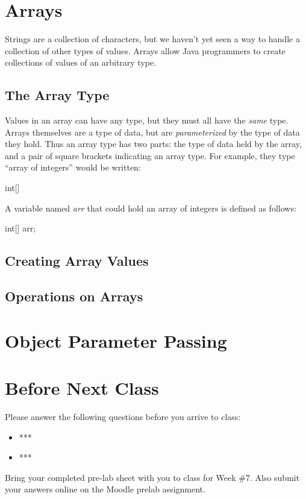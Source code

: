 \section{Arrays}

Strings are a collection of characters, but we haven't yet seen a way to handle a collection of other types of values. Arrays allow Java programmers to create collections of values of an arbitrary type. 

\subsection{The Array Type}

Values in an array can have any type, but they must all have the \textit{same} type. Arrays themselves are a type of data, but are \textit{parameterized} by the type of data they hold. Thus an array type has two parts: the type of data held by the array, and a pair of square brackets indicating an array type. For example, they type ``array of integers'' would be written:
\begin{code}
int[] 
\end{code}

A variable named \textit{arr} that could hold an array of integers is defined as follows:

\begin{code}
int[] arr;
\end{code}

\subsection{Creating Array Values}

\subsection{Operations on Arrays}

\section{Object Parameter Passing}


\section{Before Next Class}

Please answer the following questions before you arrive to class:

\begin{exer}

\begin{itemize}

\item ***

  \evalline
  
\item ***

  \evalline
  
\end{itemize}

\end{exer}

Bring your completed pre-lab sheet with you to class for Week \#7. Also submit your answers online on the Moodle prelab assignment.  

